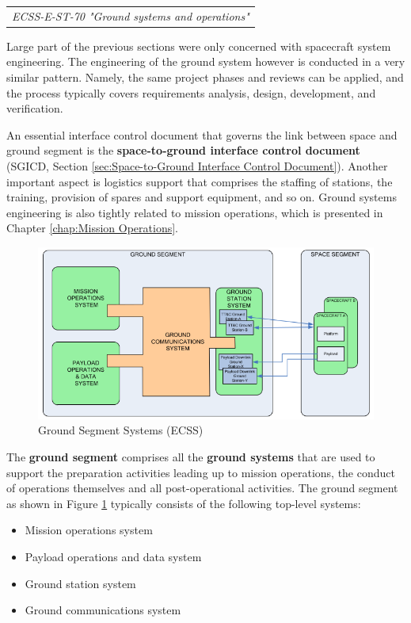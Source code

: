\begin{tabular}{l}
\textit{ECSS-E-ST-70 "Ground systems and operations" \cite{ECSS-E-ST-70}}
\end{tabular}

Large part of the previous sections were only concerned with spacecraft system engineering. The engineering of the ground system however is conducted in a very similar pattern. Namely, the same project phases and reviews can be applied, and the process typically covers requirements analysis, design, development, and verification. 

An essential interface control document that governs the link between space and ground segment is the \textbf{space-to-ground interface control document} (SGICD, Section \ref{sec:Space-to-Ground Interface Control Document}). Another important aspect is logistics support that comprises the staffing of stations, the training, provision of spares and support equipment, and so on. Ground systems engineering is also tightly related to mission operations, which is presented in Chapter \ref{chap:Mission Operations}.

\begin{figure}[h]
\centering\includegraphics[scale=0.5]{fig/ground_segment_systems}
\caption{Ground Segment Systems (ECSS)}
\label{fig:Ground Segment Systems}
\end{figure}

The \textbf{ground segment} comprises all the \textbf{ground systems} that are used to support the preparation activities leading up to mission operations, the conduct of operations themselves and all post-operational activities. The ground segment as shown in Figure \ref{fig:Ground Segment Systems} typically consists of the following top-level systems:

\begin{itemize}
\item Mission operations system
\item Payload operations and data system
\item Ground station system
\item Ground communications system
\end{itemize}


